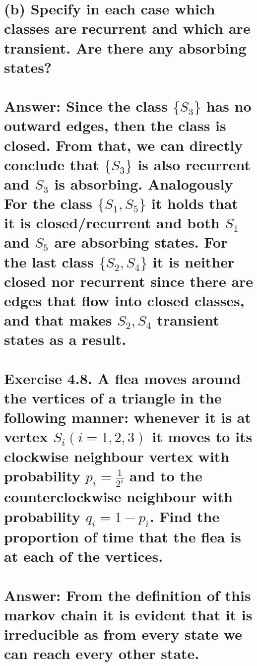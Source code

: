 \documentclass[11px]{article}
\begin{document}
\section*{\normalfont (b) Specify in each case which classes are recurrent and which are transient. Are there any absorbing states?}

\section*{Answer: \normalfont Since the class $\{S_3\}$ has no outward edges, then the class is closed. From that, we can directly conclude that $\{S_3\}$ is also recurrent and $S_3$ is absorbing. Analogously For the class $\{S_1, S_5\}$ it holds that it is closed/recurrent and both $S_1$ and $S_5$ are absorbing states. For the last class $\{S_2, S_4\}$ it is neither closed nor recurrent since there are edges that flow into closed classes, and that makes $S_2, S_4$ transient states as a result.}

\section*{Exercise 4.8. \normalfont A flea moves around the vertices of a triangle in the following manner: whenever it is at vertex $S_i (i = 1, 2, 3)$ it moves to its clockwise neighbour vertex with probability $p_i = \frac{1}{2^i}$ and to the counterclockwise neighbour with probability $q_i = 1 - p_i$. Find the proportion of time that the flea is at each of the vertices.}

\section*{Answer: \normalfont From the definition of this markov chain it is evident that it is irreducible as from every state we can reach every other state. }

\begin{center}
\end{center}
\end{document}
